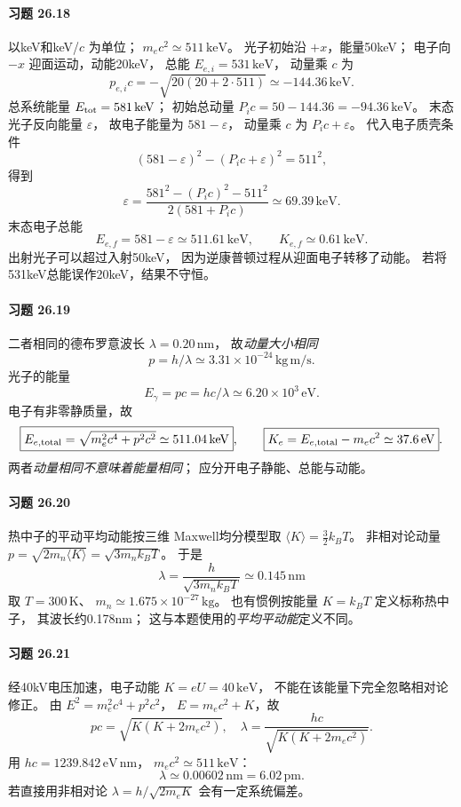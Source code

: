 \paragraph{习题 26.18}
以keV和keV/\(c\) 为单位；
\(m_ec^2\simeq511\,\mathrm{keV}\)。
光子初始沿 \(+x\)，能量50keV；
电子向 \(-x\) 迎面运动，动能20keV，
总能 \(E_{e,i}=531\,\mathrm{keV}\)，
动量乘 \(c\) 为
\[
p_{e,i}c=-\sqrt{20(20+2\cdot511)}
\simeq-144.36\,\mathrm{keV}.
\]
总系统能量
\(E_{\rm tot}=581\,\mathrm{keV}\)；
初始总动量
\(P_ic=50-144.36=-94.36\,\mathrm{keV}\)。
末态光子反向能量 \(\varepsilon\)，
故电子能量为 \(581-\varepsilon\)，
动量乘 \(c\) 为 \(P_ic+\varepsilon\)。
代入电子质壳条件
\[
(581-\varepsilon)^2-
(P_ic+\varepsilon)^2=511^2,
\]
得到
\[
\boxed{\varepsilon
=\frac{581^2-(P_ic)^2-511^2}
{2(581+P_ic)}
\simeq69.39\,\mathrm{keV}}.
\]
末态电子总能
\[
\boxed{E_{e,f}=581-\varepsilon
\simeq511.61\,\mathrm{keV}},
\qquad
\boxed{K_{e,f}\simeq0.61\,\mathrm{keV}}.
\]
出射光子可以超过入射50keV，
因为逆康普顿过程从迎面电子转移了动能。
若将531keV总能误作20keV，结果不守恒。

\paragraph{习题 26.19}
二者相同的德布罗意波长
\(\lambda=0.20\,\mathrm{nm}\)，
故\emph{动量大小相同}
\[
\boxed{p=h/\lambda
\simeq3.31\times10^{-24}\,\mathrm{kg\,m/s}}.
\]
光子的能量
\[
\boxed{E_\gamma=pc=hc/\lambda
\simeq6.20\times10^3\,\mathrm{eV}}.
\]
电子有非零静质量，故
\[
\boxed{E_{e,\rm total}
=\sqrt{m_e^2c^4+p^2c^2}
\simeq511.04\,\mathrm{keV}},
\qquad
\boxed{K_e=E_{e,\rm total}-m_ec^2
\simeq37.6\,\mathrm{eV}}.
\]
两者\emph{动量相同不意味着能量相同}；
应分开电子静能、总能与动能。

\paragraph{习题 26.20}
热中子的平动平均动能按三维
Maxwell均分模型取
\(\langle K\rangle=\frac32k_BT\)。
非相对论动量
\(p=\sqrt{2m_n\langle K\rangle}
=\sqrt{3m_nk_BT}\)。
于是
\[
\boxed{\lambda=\frac h{\sqrt{3m_nk_BT}}
\simeq0.145\,\mathrm{nm}}
\]
取 \(T=300\,\mathrm K\)、
\(m_n\simeq1.675\times10^{-27}\,\mathrm{kg}\)。
也有惯例按能量 \(K=k_BT\) 定义标称热中子，
其波长约0.178nm；
这与本题使用的\emph{平均平动能}定义不同。

\paragraph{习题 26.21}
经40kV电压加速，电子动能
\(K=eU=40\,\mathrm{keV}\)，
不能在该能量下完全忽略相对论修正。
由 \(E^2=m_e^2c^4+p^2c^2\)，
\(E=m_ec^2+K\)，故
\[
pc=\sqrt{K(K+2m_ec^2)},\quad
\boxed{\lambda=\frac{hc}{\sqrt{K(K+2m_ec^2)}}}.
\]
用 \(hc=1239.842\,\mathrm{eV\,nm}\)，
\(m_ec^2\simeq511\,\mathrm{keV}\)：
\[
\boxed{\lambda\simeq0.00602\,\mathrm{nm}
=6.02\,\mathrm{pm}}.
\]
若直接用非相对论 \(\lambda=h/\sqrt{2m_eK}\)
会有一定系统偏差。

